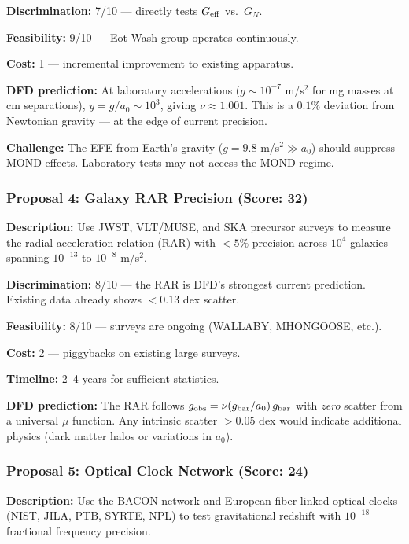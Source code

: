 \documentclass[11pt,a4paper]{article}
\begin{document}
\textbf{Discrimination:} 7/10 --- directly tests $G_{\rm eff}$ vs.\ $G_N$.

\textbf{Feasibility:} 9/10 --- Eot-Wash group operates continuously.

\textbf{Cost:} 1 --- incremental improvement to existing apparatus.

\textbf{DFD prediction:} At laboratory accelerations ($g \sim 10^{-7}$ m/s$^2$ for mg masses at cm separations), $y = g/a_0 \sim 10^3$, giving $\nu \approx 1.001$. This is a $0.1\%$ deviation from Newtonian gravity --- at the edge of current precision.

\textbf{Challenge:} The EFE from Earth's gravity ($g = 9.8$ m/s$^2 \gg a_0$) should suppress MOND effects. Laboratory tests may not access the MOND regime.

\subsubsection{Proposal 4: Galaxy RAR Precision (Score: 32)}

\textbf{Description:} Use JWST, VLT/MUSE, and SKA precursor surveys to measure the radial acceleration relation (RAR) with $< 5\%$ precision across $10^4$ galaxies spanning $10^{-13}$ to $10^{-8}$ m/s$^2$.

\textbf{Discrimination:} 8/10 --- the RAR is DFD's strongest current prediction. Existing data already shows $< 0.13$ dex scatter.

\textbf{Feasibility:} 8/10 --- surveys are ongoing (WALLABY, MHONGOOSE, etc.).

\textbf{Cost:} 2 --- piggybacks on existing large surveys.

\textbf{Timeline:} 2--4 years for sufficient statistics.

\textbf{DFD prediction:} The RAR follows $g_{\rm obs} = \nu(g_{\rm bar}/a_0)\,g_{\rm bar}$ with \emph{zero} scatter from a universal $\mu$ function. Any intrinsic scatter $> 0.05$ dex would indicate additional physics (dark matter halos or variations in $a_0$).

\subsubsection{Proposal 5: Optical Clock Network (Score: 24)}

\textbf{Description:} Use the BACON network and European fiber-linked optical clocks (NIST, JILA, PTB, SYRTE, NPL) to test gravitational redshift with $10^{-18}$ fractional frequency precision.
\end{document}
